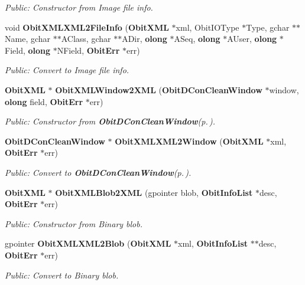 \begin{CompactItemize}
\begin{CompactList}\small\item\em Public: Constructor from Image file info. \item\end{CompactList}\item 
void {\bf Obit\-XMLXML2File\-Info} ({\bf Obit\-XML} $\ast$xml, Obit\-IOType $\ast$Type, gchar $\ast$$\ast$Name, gchar $\ast$$\ast$AClass, gchar $\ast$$\ast$ADir, {\bf olong} $\ast$ASeq, {\bf olong} $\ast$AUser, {\bf olong} $\ast$Field, {\bf olong} $\ast$NField, {\bf Obit\-Err} $\ast$err)
\begin{CompactList}\small\item\em Public: Convert to Image file info. \item\end{CompactList}\item 
{\bf Obit\-XML} $\ast$ {\bf Obit\-XMLWindow2XML} ({\bf Obit\-DCon\-Clean\-Window} $\ast$window, {\bf olong} field, {\bf Obit\-Err} $\ast$err)
\begin{CompactList}\small\item\em Public: Constructor from {\bf Obit\-DCon\-Clean\-Window}{\rm (p.\,\pageref{structObitDConCleanWindow})}. \item\end{CompactList}\item 
{\bf Obit\-DCon\-Clean\-Window} $\ast$ {\bf Obit\-XMLXML2Window} ({\bf Obit\-XML} $\ast$xml, {\bf Obit\-Err} $\ast$err)
\begin{CompactList}\small\item\em Public: Convert to {\bf Obit\-DCon\-Clean\-Window}{\rm (p.\,\pageref{structObitDConCleanWindow})}. \item\end{CompactList}\item 
{\bf Obit\-XML} $\ast$ {\bf Obit\-XMLBlob2XML} (gpointer blob, {\bf Obit\-Info\-List} $\ast$desc, {\bf Obit\-Err} $\ast$err)
\begin{CompactList}\small\item\em Public: Constructor from Binary blob. \item\end{CompactList}\item 
gpointer {\bf Obit\-XMLXML2Blob} ({\bf Obit\-XML} $\ast$xml, {\bf Obit\-Info\-List} $\ast$$\ast$desc, {\bf Obit\-Err} $\ast$err)
\begin{CompactList}\small\item\em Public: Convert to Binary blob. \item\end{CompactList}\item 

\end{CompactItemize}
